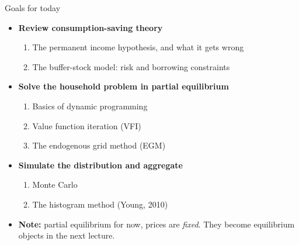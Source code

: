 \documentclass[
  10pt,
  ignorenonframetext,
  aspectratio=43,
  english,
  handout]{beamer}
\providecommand{\tightlist}{%
  \setlength{\itemsep}{0pt}\setlength{\parskip}{0pt}}
\begin{document}
\begin{frame}{Goals for today}
\protect{}\label{goals-for-today}
\begin{itemize}
\tightlist
\item
  \textbf{Review consumption-saving theory}

  \begin{enumerate}
  \tightlist
  \item
    The permanent income hypothesis, and what it gets wrong
  \item
    The buffer-stock model: risk and borrowing constraints
  \end{enumerate}
\item
  \textbf{Solve the household problem in partial equilibrium}

  \begin{enumerate}
  \tightlist
  \item
    Basics of dynamic programming
  \item
    Value function iteration (VFI)
  \item
    The endogenous grid method (EGM)
  \end{enumerate}
\item
  \textbf{Simulate the distribution and aggregate}

  \begin{enumerate}
  \tightlist
  \item
    Monte Carlo
  \item
    The histogram method (Young, 2010)
  \end{enumerate}
\item
  \textbf{Note:} partial equilibrium for now, prices are \emph{fixed}.
  They become equilibrium objects in the next lecture.
\end{itemize}
\end{frame}
\end{document}
